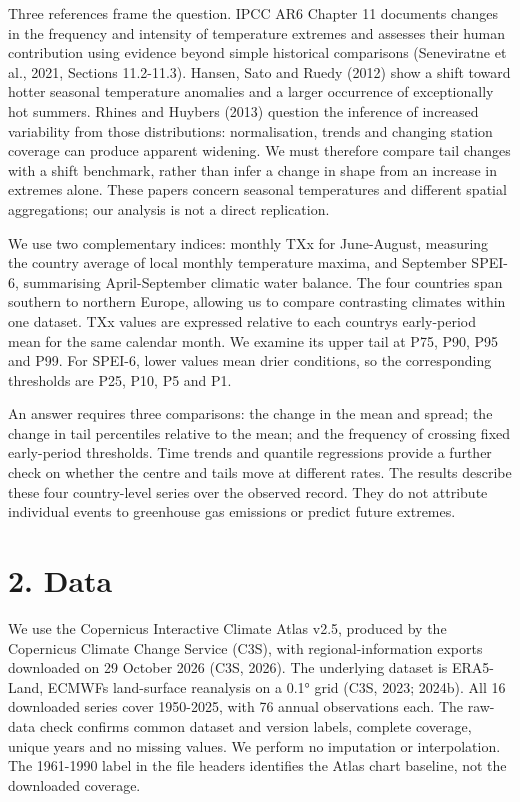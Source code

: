 \documentclass[
  10pt,
]{article}
\begin{document}
Three references frame the question. IPCC AR6 Chapter 11 documents
changes in the frequency and intensity of temperature extremes and
assesses their human contribution using evidence beyond simple
historical comparisons (Seneviratne et al., 2021, Sections 11.2-11.3).
Hansen, Sato and Ruedy (2012) show a shift toward hotter seasonal
temperature anomalies and a larger occurrence of exceptionally hot
summers. Rhines and Huybers (2013) question the inference of increased
variability from those distributions: normalisation, trends and changing
station coverage can produce apparent widening. We must therefore
compare tail changes with a shift benchmark, rather than infer a change
in shape from an increase in extremes alone. These papers concern
seasonal temperatures and different spatial aggregations; our analysis
is not a direct replication.

We use two complementary indices: monthly TXx for June-August, measuring
the country average of local monthly temperature maxima, and September
SPEI-6, summarising April-September climatic water balance. The four
countries span southern to northern Europe, allowing us to compare
contrasting climates within one dataset. TXx values are expressed
relative to each country\textquotesingle s early-period mean for the
same calendar month. We examine its upper tail at P75, P90, P95 and P99.
For SPEI-6, lower values mean drier conditions, so the corresponding
thresholds are P25, P10, P5 and P1.

An answer requires three comparisons: the change in the mean and spread;
the change in tail percentiles relative to the mean; and the frequency
of crossing fixed early-period thresholds. Time trends and quantile
regressions provide a further check on whether the centre and tails move
at different rates. The results describe these four country-level series
over the observed record. They do not attribute individual events to
greenhouse gas emissions or predict future extremes.

\section{2. Data}\label{data}

We use the Copernicus Interactive Climate Atlas v2.5, produced by the
Copernicus Climate Change Service (C3S), with regional-information
exports downloaded on 29 October 2026 (C3S, 2026). The underlying dataset is
ERA5-Land, ECMWF\textquotesingle s land-surface reanalysis on a 0.1°
grid (C3S, 2023; 2024b). All 16 downloaded series cover
1950-2025, with 76 annual observations each. The raw-data check confirms
common dataset and version labels, complete coverage, unique years and
no missing values. We perform no imputation or interpolation. The
1961-1990 label in the file headers identifies the Atlas chart baseline,
not the downloaded coverage.
\end{document}

